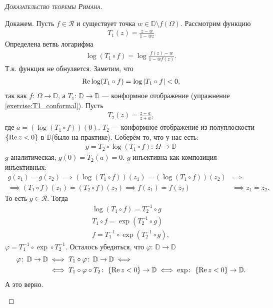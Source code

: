 \documentclass[../complex-analysis.tex]{subfiles}
\begin{document}
\begin{proof}[\normalfont\textsc{Доказательство теоремы Римана}]
\begin{enumerate}
   Докажем. Пусть $ f \in \mathcal R $ и существует точка $ w \in \mathbb D \setminus f(\Omega) $. Рассмотрим функцию
   \begin{align*}
    T_1(z) = \frac{z-w}{1 - \overline w z}
   \end{align*} Определена ветвь логарифма
   \begin{align*}
    \log (T_1 \circ f) = \log \frac{f(z) - w}{1 - \overline w f(z)}.
   \end{align*} Т.к. функция не обнуляется. Заметим, что
   \begin{align*}
    \operatorname{Re} \log (T_1 \circ f) = \log \left| T_1 \circ f \right| < 0,
\end{align*} так как $ f \colon\,\Omega \to \mathbb D $, а $ T_1 \colon\,\mathbb D \to \mathbb D $ --- конформное отображение (упражнение \eqref{exercise:T1_conformal}). Пусть
   \begin{align*}
    T_2(z) = \frac{z-a}{z+a},
   \end{align*} где $ a = (\log (T_1 \circ f))(0) $. $ T_2 $ --- конформное отображение из полуплоскости $ \left\{ \operatorname{Re} z < 0 \right\} $ в $ \mathbb D $(было на практике). Соберём то, что у нас есть:
   \begin{align*}
    g = T_2 \circ \log (T_1 \circ f)\colon\,\Omega \to \mathbb D
   \end{align*} $ g $ аналитическая, $ g(0) = T_2(a) = 0 $. $ g $ инъективна как композиция инъективных:
   \begin{align*}
	   g(z_1) = g(z_2) \implies (\log(T_1 \circ f))(z_1) = (\log(T_1 \circ f))(z_2) &\implies \\
	   \implies (T_1 \circ f) (z_1) = (T_2 \circ f)(z_2) \implies f(z_1) = f(z_2) &\implies z_1 = z_2.
   \end{align*} То есть $ g \in \mathcal R $. Тогда
   \begin{align*}
    \log(T_1 \circ f) = T_2^{-1} \circ g \\
    T_1 \circ f = \exp (T_2^{-1} \circ g) \\
    f = T_1^{-1} \circ \exp (T_2^{-1} \circ g),
   \end{align*} $ \varphi = T_1^{-1} \circ \exp \circ T_2^{-1} $. Осталось убедиться, что $ \varphi \colon\,\mathbb D \to \mathbb D$ 
   \begin{align*}
	\varphi \colon\,\mathbb D \to \mathbb D &\iff T_1 \circ \varphi \colon\,\mathbb D \to \mathbb D \iff \\
	&\iff T_1 \circ \varphi \circ T_2 \colon\,\left\{ \operatorname{Re} z < 0 \right\} \to \mathbb D \iff \exp \colon\,\left\{ \operatorname{Re} z < 0 \right\} \to \mathbb D.
   \end{align*} А это верно.


\end{enumerate}
\end{proof}
\end{document}
